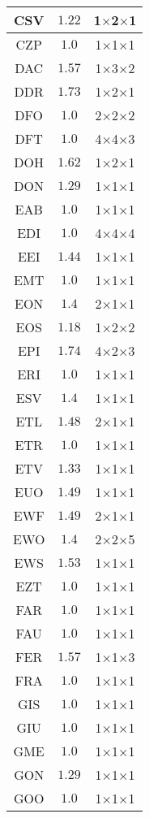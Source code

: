 \documentclass[main.tex]{subfiles}
\begin{document}
\begin{table}
{\begin{minipage}[t]{0.24\linewidth}
\begin{tabular}{|@{\hspace{2pt}}c@{\hspace{2pt}}|@{\hspace{2pt}}c@{\hspace{2pt}}|@{\hspace{2pt}}c@{\hspace{2pt}}|}
CSV&$1.22$&1$\times$2$\times$1\\\hline
CZP&$1.0$&1$\times$1$\times$1\\\hline
DAC&$1.57$&1$\times$3$\times$2\\\hline
DDR&$1.73$&1$\times$2$\times$1\\\hline
DFO&$1.0$&2$\times$2$\times$2\\\hline
DFT&$1.0$&4$\times$4$\times$3\\\hline
DOH&$1.62$&1$\times$2$\times$1\\\hline
DON&$1.29$&1$\times$1$\times$1\\\hline
EAB&$1.0$&1$\times$1$\times$1\\\hline
EDI&$1.0$&4$\times$4$\times$4\\\hline
EEI&$1.44$&1$\times$1$\times$1\\\hline
EMT&$1.0$&1$\times$1$\times$1\\\hline
EON&$1.4$&2$\times$1$\times$1\\\hline
EOS&$1.18$&1$\times$2$\times$2\\\hline
EPI&$1.74$&4$\times$2$\times$3\\\hline
ERI&$1.0$&1$\times$1$\times$1\\\hline
ESV&$1.4$&1$\times$1$\times$1\\\hline
ETL&$1.48$&2$\times$1$\times$1\\\hline
ETR&$1.0$&1$\times$1$\times$1\\\hline
ETV&$1.33$&1$\times$1$\times$1\\\hline
EUO&$1.49$&1$\times$1$\times$1\\\hline
EWF&$1.49$&2$\times$1$\times$1\\\hline
EWO&$1.4$&2$\times$2$\times$5\\\hline
EWS&$1.53$&1$\times$1$\times$1\\\hline
EZT&$1.0$&1$\times$1$\times$1\\\hline
FAR&$1.0$&1$\times$1$\times$1\\\hline
FAU&$1.0$&1$\times$1$\times$1\\\hline
FER&$1.57$&1$\times$1$\times$3\\\hline
FRA&$1.0$&1$\times$1$\times$1\\\hline
GIS&$1.0$&1$\times$1$\times$1\\\hline
GIU&$1.0$&1$\times$1$\times$1\\\hline
GME&$1.0$&1$\times$1$\times$1\\\hline
GON&$1.29$&1$\times$1$\times$1\\\hline
GOO&$1.0$&1$\times$1$\times$1\\\hline

\end{tabular}
\end{minipage}}
\end{table}
\end{document}

